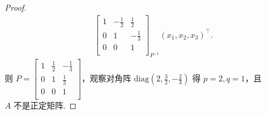 \begin{proof}
\[\begin{aligned}
{\begin{bmatrix}
        1 & -\frac{1}{2} & \frac{1}{2} \\
        0 & 1 & -\frac{1}{3} \\
        0 & 0 & 1 \\
    \end{bmatrix}}_{P^{-1}} \left(x_1, x_2, x_3\right)^\top.
\end{aligned}
\]
则 $P = \boxed{\begin{bmatrix}
    1 & \frac{1}{2} & -\frac{1}{3} \\
    0 & 1 & \frac{1}{3} \\
    0 & 0 & 1 \\
\end{bmatrix}}$，观察对角阵 $\mathrm{diag}\left(2, \frac{3}{2}, -\frac{2}{3}\right)$ 得 $\boxed{p = 2, q = 1}$，且 $\boxed{A \textrm{ 不是正定矩阵}}$.

\end{proof}
